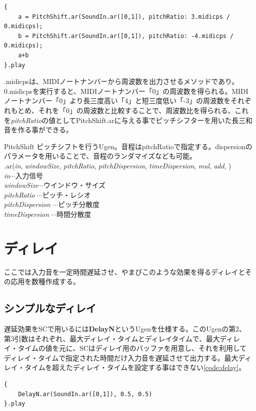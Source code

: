 \documentclass{jsarticle}
\begin{document}
\begin{lstlisting}[caption=ピッチシフターによる和音, label=code:ps_chord]
{
	a = PitchShift.ar(SoundIn.ar([0,1]), pitchRatio: 3.midicps / 0.midicps);
	b = PitchShift.ar(SoundIn.ar([0,1]), pitchRatio: -4.midicps / 0.midicps);
	a+b
}.play
\end{lstlisting}

.midicpsは、MIDIノートナンバーから周波数を出力させるメソッドであり。0.midicpsを実行すると、MIDIノートナンバー「0」の周波数を得られる。MIDIノートナンバー「0」より長三度高い「4」と短三度低い「-3」の周波数をそれぞれもとめ、それを「0」の周波数と比較することで、周波数比を得られる、これを{\it pitchRatio}の値としてPitchShift.arに与える事でピッチシフターを用いた長三和音を作る事ができる。

\begin{itembox}[l]{PitchShift}
{\footnotesize 
ピッチシフトを行うUgen。音程はpitchRatioで指定する。dispersionのパラメータを用いることで、音程のランダマイズなども可能。\\
.ar({\it in}, {\it windowSize}, {\it pitchRatio}, {\it pitchDispersion}, {\it timeDispersion}, {\it mul}, {\it add}, )\\

{\it in}$\cdots$入力信号\\
{\it windowSize}$\cdots$ウインドウ・サイズ\\
{\it pitchRatio} $\cdots$ピッチ・レシオ\\
{\it pitchDispersion} $\cdots$ピッチ分散度\\
{\it timeDispersion} $\cdots$時間分散度\\
}
\end{itembox}

\section{ディレイ}
ここでは入力音を一定時間遅延させ、やまびこのような効果を得るディレイとその応用を数種作成する。

\subsection{シンプルなディレイ}

遅延効果をSCで用いるには{\bf DelayN}というUgenを仕様する。このUgenの第2、第3引数はそれぞれ、最大ディレイ・タイムとディレイタイムで、最大ディレイ・タイムの値を元に、SCはディレイ用のバッファを用意し、それを利用してディレイ・タイムで指定された時間だけ入力音を遅延させて出力する。最大ディレイ・タイムを超えたディレイ・タイムを設定する事はできない\ref{code:delay}。
\begin{lstlisting}[caption=ディレイ, label=code:delay]
{
	DelayN.ar(SoundIn.ar([0,1]), 0.5, 0.5)
}.play
\end{lstlisting}
\end{document}
